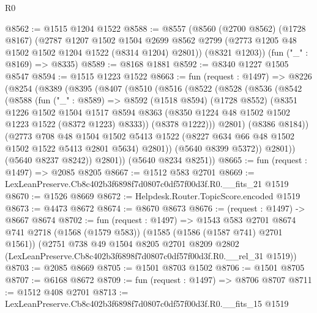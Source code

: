 \begin{lexlean}{R0}
\begin{coremodule}
@8562 := @1515 @1204 @1522
@8588 := @8557
    (@8560
      (@2700 @8562)
      (@1728 @8167)
      (@2787
        @1207
        @1502
        @1504
        @2699
        @8562
        @2799
        (@2773 @1205 @48 @1502 @1502 @1204 @1522 (@8314 @1204) @2801))
      (@8321 @1203))
    (fun ("_" : @8169) => @8335)
@8589 := @8168 @1881
@8592 := @8340 @1227 @1505 @8547
@8594 := @1515 @1223 @1522
@8663 := fun (request : @1497) =>
  @8226
    (@8254
      (@8389
        (@8395
          (@8407
            (@8510
              (@8516
                (@8522
                  (@8528
                    (@8536
                      (@8542
                        (@8588
                          (fun ("_" : @8589) =>
                          @8592
                            (@1518 @8594)
                            (@1728 @8552)
                            (@8351
                              @1226
                              @1502
                              @1504
                              @1517
                              @8594
                              @8363
                              (@8350 @1224 @48 @1502 @1502 @1223 @1522 (@8372 @1223) @8333))
                            (@8378 @1222)))
                        @2801)
                      (@8386 @8184))
                    (@2773
                      @708
                      @48
                      @1504
                      @1502
                      @5413
                      @1522
                      (@8227 @634 @66 @48 @1502 @1502 @1522 @5413 @2801 @5634)
                      @2801))
                  (@5640 @8399 @5372))
                @2801))
            (@5640 @8237 @8242))
          @2801))
      (@5640 @8234 @8251))
@8665 := fun (request : @1497) => @2085 @8205
@8667 := @1512 @583 @2701
@8669 := LexLeanPreserve.Cb8c402b3f6898f7d0807c0df57f00d3f.R0.__fits_21 @1519
@8670 := @1526 @8669
@8672 := Helpdesk.Router.TopicScore.encoded @1519
@8673 := @4473 @8672
@8674 := @8670 @8673
@8676 := (request : @1497) -> @8667 @8674
@8702 := fun (request : @1497) =>
  @1543
    @583
    @2701
    @8674
    @741
    @2718
    (@1568 (@1579 @583))
    (@1585 (@1586 (@1587 @741) @2701 @1561))
    (@2751
      @738
      @49
      @1504
      @8205
      @2701
      @8209
      @2802
      (LexLeanPreserve.Cb8c402b3f6898f7d0807c0df57f00d3f.R0.__rel_31 @1519))
@8703 := @2085 @8669
@8705 := @1501 @8703 @1502
@8706 := @1501 @8705
@8707 := @6168 @8672
@8709 := fun (request : @1497) => @8706 @8707
@8711 := @1512 @408 @2701
@8713 := LexLeanPreserve.Cb8c402b3f6898f7d0807c0df57f00d3f.R0.__fits_15 @1519

\end{coremodule}
\end{lexlean}
